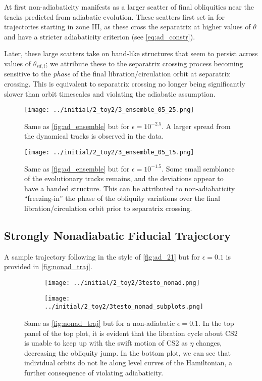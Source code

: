 \documentclass[
        fleqn,
        usenatbib,
    ]{mnras}
\begin{document}
At first non-adiabaticity manifests as a larger scatter of final obliquities
near the tracks predicted from adiabatic evolution. These scatters first set in
for trajectories starting in zone III, as these cross the separatrix at higher
values of $\theta$ and have a stricter adiabaticity criterion (see
\autoref{eq:ad_constr}).

Later, these large scatters take on band-like structures that seem to persist
across values of $\theta_{sd, i}$; we attribute these to the separatrix crossing
process becoming sensitive to the \emph{phase} of the final
libration/circulation orbit at separatrix crossing. This is equivalent to
separatrix crossing no longer being significantly slower than orbit timescales
and violating the adiabatic assumption.
\begin{figure}
    \centering
    \texttt{[image: ../initial/2\_toy2/3\_ensemble\_05\_25.png]}
    \caption{Same as \autoref{fig:ad_ensemble} but for $\epsilon = 10^{-2.5}$.
    A larger spread from the dynamical tracks is observed in the
    data.}\label{fig:3_ensemble_05_25}
\end{figure}
\begin{figure}
    \centering
    \texttt{[image: ../initial/2\_toy2/3\_ensemble\_05\_15.png]}
    \caption{Same as \autoref{fig:ad_ensemble} but for $\epsilon = 10^{-1.5}$.
    Some small semblance of the evolutionary tracks remains, and the deviations
    appear to have a banded structure. This can be attributed to
    non-adiabaticity ``freezing-in'' the phase of the obliquity variations over
    the final libration/circulation orbit prior to separatrix
    crossing.}\label{fig:3_ensemble_05_15}
\end{figure}

\subsection{Strongly Nonadiabatic Fiducial Trajectory}

A sample trajectory following in the style of \autoref{fig:ad_21} but for
$\epsilon = 0.1$ is provided in \autoref{fig:nonad_traj}.
\begin{figure}
    \centering
    \begin{subfigure}{\columnwidth}
        \centering
        \texttt{[image: ../initial/2\_toy2/3testo\_nonad.png]}
    \end{subfigure}
    \begin{subfigure}{\columnwidth}
        \centering
        \texttt{[image: ../initial/2\_toy2/3testo\_nonad\_subplots.png]}
    \end{subfigure}
    \caption{Same as \autoref{fig:nonad_traj} but for a non-adiabatic $\epsilon =
    0.1$. In the top panel of the top plot, it is evident that the libration
    cycle about CS2 is unable to keep up with the swift motion of CS2 as $\eta$
    changes, decreasing the obliquity jump. In the bottom plot, we can see that
    individual orbits do not lie along level curves of the Hamiltonian, a
    further consequence of violating adiabaticity.}\label{fig:nonad_traj}
\end{figure}
\end{document}
